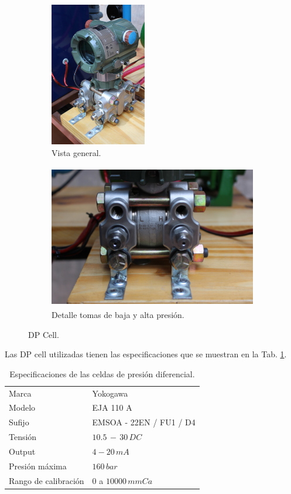 \begin{figure}[ht]
        \centering
        \begin{subfigure}[b]{0.31\textwidth}
        \centering
\includegraphics[height=6.3cm]
	{Cap2-DisenoEnsamblado/images/dpcell1.JPG}
	\caption{Vista general.}
        \end{subfigure}%
        \hfil
        \begin{subfigure}[b]{0.69\textwidth}
        \centering
\includegraphics[height=6.3cm]
	{Cap2-DisenoEnsamblado/images/dpcell2.JPG}
	\caption{Detalle tomas de baja y alta presión.}
        \end{subfigure}
        \caption{DP Cell.}
        \label{fig:dpcelfig}
\end{figure}

Las DP cell utilizadas tienen las especificaciones que se muestran en la Tab.
\ref{tab:caractDPcell}.

\begin{table}[ht]
\renewcommand{\arraystretch}{1.3}
\centering
\begin{tabular}{|l|l|}
\hline
Marca & Yokogawa\\
Modelo & EJA 110 A\\
Sufijo & EMSOA - 22EN / FU1 / D4\\
Tensión & $10.5\,-\,30 \, DC$\\
Output & $4-20\,mA$\\
Presión máxima & $160\,bar$\\
Rango de calibración & $0$ a $10000\,mmCa$\\
\hline
\end{tabular}
\caption{Especificaciones de las celdas de presión diferencial.}
\label{tab:caractDPcell}
\end{table}

